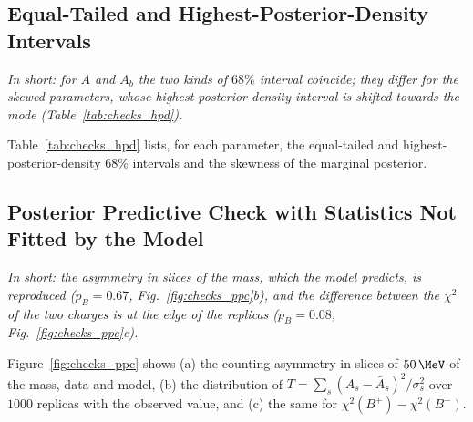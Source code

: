 \subsection{Equal-Tailed and Highest-Posterior-Density Intervals}
\label{sec:checks_hpd}
\emph{In short: for $A$ and $A_b$ the two kinds of $68\%$ interval coincide; they differ for the skewed parameters, whose highest-posterior-density interval is shifted towards the mode (Table~\ref{tab:checks_hpd}).}

Table~\ref{tab:checks_hpd} lists, for each parameter, the equal-tailed and highest-posterior-density $68\%$ intervals and the skewness of the marginal posterior.

\begin{table}[h]
\centering
{}
\caption{Equal-tailed and highest-posterior-density $68\%$ intervals and skewness of the marginal posteriors.}
\label{tab:checks_hpd}
\end{table}

\subsection{Posterior Predictive Check with Statistics Not Fitted by the Model}
\label{sec:checks_ppc}
\emph{In short: the asymmetry in slices of the mass, which the model predicts, is reproduced ($p_B=0.67$, Fig.~\ref{fig:checks_ppc}b), and the difference between the $\chi^2$ of the two charges is at the edge of the replicas ($p_B=0.08$, Fig.~\ref{fig:checks_ppc}c).}

Figure~\ref{fig:checks_ppc} shows (a) the counting asymmetry in slices of $50\,\MeV$ of the mass, data and model, (b) the distribution of $T=\sum_s(A_s-\bar A_s)^2/\sigma_s^2$ over $1000$ replicas with the observed value, and (c) the same for $\chi^2(B^+)-\chi^2(B^-)$.

